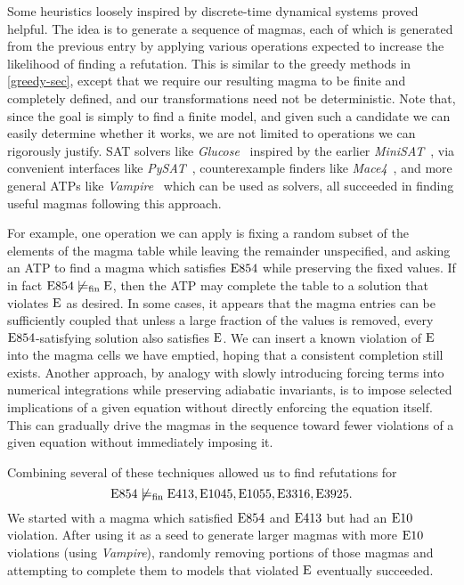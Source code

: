  Some heuristics loosely inspired by discrete-time dynamical systems proved helpful.
 The idea is to generate a sequence of magmas, each of which is generated from the previous entry by applying various operations expected to increase the likelihood of
 finding a refutation.  This is similar to the greedy methods in \ref{greedy-sec}, except that we require our resulting magma to be finite and completely
 defined, and our transformations need not be deterministic.  Note that, since the goal is simply to find a finite model, and given such a candidate we can easily
 determine whether it works, we are not limited to operations we can rigorously justify.  SAT solvers like
 \emph{Glucose}~\cite{DBLP:conf/ijcai/AudemardS09,DBLP:conf/cp/AudemardS12} inspired by the earlier \emph{MiniSAT}~\cite{DBLP:conf/sat/EenS03},
 via convenient interfaces like \emph{PySAT}~\cite{imms-sat18, itk-sat24}, counterexample finders like \emph{Mace4}~\cite{prover9-mace4}, and more general ATPs like
 \emph{Vampire}~\cite{DBLP:conf/cav/KovacsV13} which can be used as solvers, all succeeded in finding useful magmas following this approach.

 For example, one operation we can apply is fixing a random subset of the elements of the magma table while leaving the remainder unspecified,
 and asking an ATP to find a magma which satisfies $\mathrm{E}854$ while preserving the fixed values.
 If in fact $\mathrm{E}854 \not\models_{\mathrm{fin}} \mathrm{E}$, then the ATP may complete the table to a solution that violates $\mathrm{E}$ as desired.  In some cases,
 it appears that the magma entries can be sufficiently coupled that unless a large fraction of the values is removed,
 every $\mathrm{E}854$-satisfying solution also satisfies $\mathrm{E}$.
 We can insert a known violation of $\mathrm{E}$ into the magma cells we have emptied, hoping that a consistent completion still exists.
 Another approach, by analogy with slowly introducing forcing terms into numerical integrations while preserving adiabatic invariants, is to impose selected
 implications of a given equation without directly enforcing the equation itself.  This can gradually drive the magmas in the
 sequence toward fewer violations of a given equation without immediately imposing it.

Combining several of these techniques allowed us to find refutations for
$$\mathrm{E}854 \not\models_{\mathrm{fin}} \mathrm{E}413, \mathrm{E}1045, \mathrm{E}1055, \mathrm{E}3316, \mathrm{E}3925.$$
 We started with a magma which satisfied $\mathrm{E}854$ and $\mathrm{E}413$ but had an $\mathrm{E}10$ violation.
After using it as a seed to generate larger magmas with more $\mathrm{E}10$ violations (using \emph{Vampire}),
randomly removing portions of those magmas and attempting to complete them to models that violated $\mathrm{E}$ eventually succeeded.

